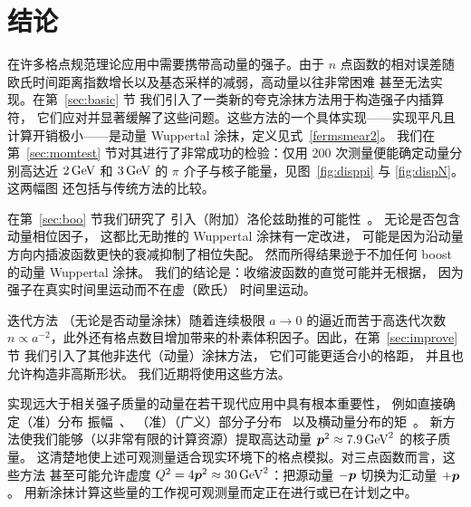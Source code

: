 \section{结论}
在许多格点规范理论应用中需要携带高动量的强子。由于 $n$ 点函数的相对误差随欧氏时间距离指数增长以及基态采样的减弱，高动量以往非常困难
甚至无法实现。在第~\ref{sec:basic} 节
我们引入了一类新的夸克涂抹方法用于构造强子内插算符，
它们应对并显著缓解了这些问题。这些方法的一个具体实现——实现平凡且计算开销极小——是动量 Wuppertal 涂抹，定义见式~\eqref{fermsmear2}。
我们在第~\ref{sec:momtest} 节对其进行了非常成功的检验：仅用 200 次测量便能确定动量分别高达近 $2\,\textmd{GeV}$
和 $3\,\textmd{GeV}$ 的 $\pi$ 介子与核子能量，见图~\ref{fig:disppi} 与 \ref{fig:dispN}。这两幅图
还包括与传统方法的比较。

在第~\ref{sec:boo} 节我们研究了
引入（附加）洛伦兹助推的可能性~\cite{Roberts:2012tp,DellaMorte:2012xc}。
无论是否包含动量相位因子，
这都比无助推的 Wuppertal 涂抹有一定改进，
可能是因为沿动量方向内插波函数更快的衰减抑制了相位失配。
然而所得结果逊于不加任何 boost 的动量 Wuppertal 涂抹。
我们的结论是：收缩波函数的直觉可能并无根据，
因为强子在真实时间里运动而不在虚（欧氏）
时间里运动。

迭代方法
（无论是否动量涂抹）随着连续极限 $a\rightarrow 0$
的逼近而苦于高迭代次数
$n\propto a^{-2}$，此外还有格点数目增加带来的朴素体积因子。因此，在第~\ref{sec:improve} 节
我们引入了其他非迭代（动量）涂抹方法，
它们可能更适合小的格距，
并且也允许构造非高斯形状。
我们近期将使用这些方法。

实现远大于相关强子质量的动量在若干现代应用中具有根本重要性，
例如直接确定（准）分布
振幅~\cite{Aglietti:1998ur,Abada:2001if,Braun:2007wv}、
（准）（广义）部分子分布~\cite{Ji:2013dva,Ji:2015jwa,Lin:2014zya,Alexandrou:2015rja}
以及横动量分布的矩~\cite{Hagler:2009mb,Musch:2010ka,Musch:2011er,Engelhardt:2015xja}。
新方法使我们能够（以非常有限的计算资源）提取高达动量 $\boldsymbol{p}^2\approx 7.9\,\textmd{GeV}^2$ 的核子质量。
这清楚地使上述可观测量适合现实环境下的格点模拟。对三点函数而言，这些方法
甚至可能允许虚度
$Q^2=4\boldsymbol{p}^2\approx 30\,\textmd{GeV}^2$：把源动量
$-\boldsymbol{p}$ 切换为汇动量 $+\boldsymbol{p}$。
用新涂抹计算这些量的工作视可观测量而定正在进行或已在计划之中。\\
